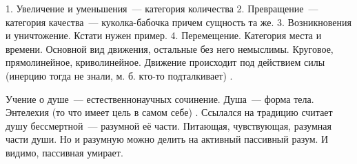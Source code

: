 	1. Увеличение и уменьшения~--- категория количества
	2. Превращение~--- категория качества~--- куколка-бабочка причем сущность та же. 
	3. Возникновения и уничтожение. Кстати нужен пример. 
	4. Перемещение. Категория места и времени. Основной вид движения, остальные без него немыслимы. Круговое, прямолинейное, криволинейное. Движение происходит под действием силы (инерцию тогда не знали, м. б. кто-то подталкивает) . 

Учение о душе~--- естественнонаучных сочинение. Душа~--- форма тела. Энтелехия (то что имеет цель в самом себе) . Ссылался на традицию считает душу бессмертной~--- разумной её части. Питающая, чувствующая, разумная части души. Но и разумную можно делить на активный пассивный разум. И видимо, пассивная умирает. 
 